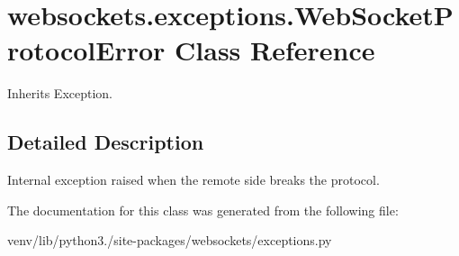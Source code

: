 \hypertarget{classwebsockets_1_1exceptions_1_1_web_socket_protocol_error}{}\section{websockets.\+exceptions.\+Web\+Socket\+Protocol\+Error Class Reference}
\label{classwebsockets_1_1exceptions_1_1_web_socket_protocol_error}


Inherits Exception.



\subsection{Detailed Description}
\begin{DoxyVerb}Internal exception raised when the remote side breaks the protocol.\end{DoxyVerb}
 

The documentation for this class was generated from the following file\+:\begin{DoxyCompactItemize}
\item 
venv/lib/python3./site-\/packages/websockets/exceptions.\+py\end{DoxyCompactItemize}
